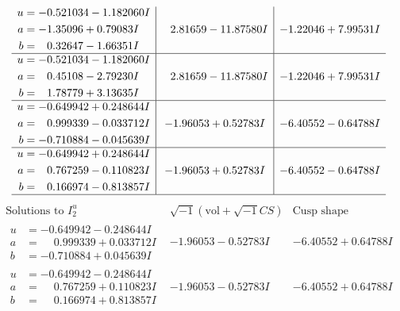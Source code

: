 \documentclass[1p]{elsarticle_modified}
\theoremstyle{definition}
\newcommand{\I}{\sqrt{-1}}
\begin{document}
$$\begin{array}{c|c|c}
\begin{aligned}
u &= -0.521034 - 1.182060 I \\
a &= -1.35096 + 0.79083 I \\
b &= \phantom{-}0.32647 - 1.66351 I\end{aligned}
 & \phantom{-}2.81659 - 11.87580 I & -1.22046 + 7.99531 I \\ \hline\begin{aligned}
u &= -0.521034 - 1.182060 I \\
a &= \phantom{-}0.45108 - 2.79230 I \\
b &= \phantom{-}1.78779 + 3.13635 I\end{aligned}
 & \phantom{-}2.81659 - 11.87580 I & -1.22046 + 7.99531 I \\ \hline\begin{aligned}
u &= -0.649942 + 0.248644 I \\
a &= \phantom{-}0.999339 - 0.033712 I \\
b &= -0.710884 - 0.045639 I\end{aligned}
 & -1.96053 + 0.52783 I & -6.40552 - 0.64788 I \\ \hline\begin{aligned}
u &= -0.649942 + 0.248644 I \\
a &= \phantom{-}0.767259 - 0.110823 I \\
b &= \phantom{-}0.166974 - 0.813857 I\end{aligned}
 & -1.96053 + 0.52783 I & -6.40552 - 0.64788 I\\
 \hline 
 \end{array}$$\newpage$$\begin{array}{c|c|c}  
\text{Solutions to }I^u_{2}& \I (\text{vol} + \sqrt{-1}CS) & \text{Cusp shape}\\
 \hline 
\begin{aligned}
u &= -0.649942 - 0.248644 I \\
a &= \phantom{-}0.999339 + 0.033712 I \\
b &= -0.710884 + 0.045639 I\end{aligned}
 & -1.96053 - 0.52783 I & -6.40552 + 0.64788 I \\ \hline\begin{aligned}
u &= -0.649942 - 0.248644 I \\
a &= \phantom{-}0.767259 + 0.110823 I \\
b &= \phantom{-}0.166974 + 0.813857 I\end{aligned}
 & -1.96053 - 0.52783 I & -6.40552 + 0.64788 I \\ \hline\begin{aligned}

\end{aligned}
\end{array}$$
\end{document}
